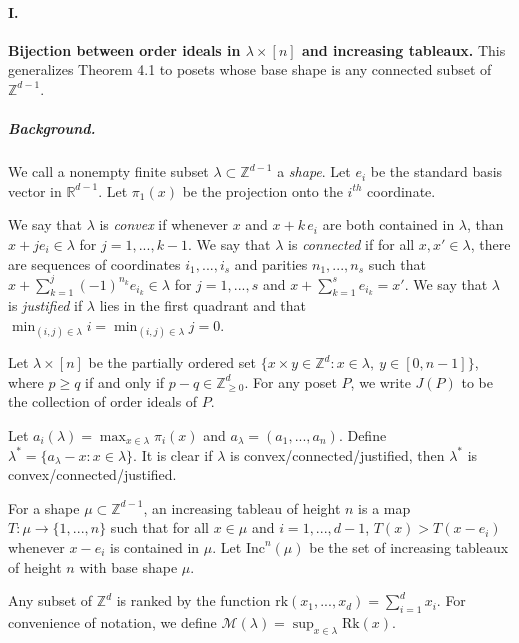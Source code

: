 \documentclass[10pt,letter]{article}
\begin{document}
\paragraph*{I.} \textbf{Bijection between order ideals in $\lambda \times [n]$ and increasing tableaux.} This generalizes Theorem 4.1 to posets whose base shape is any connected subset of $\mathbb{Z}^{d-1}$. 

\subparagraph*{Background.}

We call a nonempty finite subset $\lambda \subset \mathbb{Z}^{d-1}$ a \textit{shape}. Let $e_i$ be the standard basis vector in $\mathbb{R}^{d-1}$. Let $\pi_1(x)$ be the projection onto the $i^{th}$ coordinate.

We say that $\lambda$ is \textit{convex} if whenever $x$ and $x + k \, e_i$ are both contained in $\lambda$, than $x + j e_i \in \lambda$ for $j = 1,...,k-1$.  We say that $\lambda$ is \textit{connected} if for all $x,x' \in \lambda$, there are sequences of coordinates $i_1,...,i_s$ and parities $n_1,...,n_s$ such that $x + \sum_{k=1}^j (-1)^{n_k} e_{i_k} \in \lambda$ for $j = 1,...,s$ and $x + \sum_{k=1}^s e_{i_k} = x'$.  We say that $\lambda$ is \textit{justified} if $\lambda$ lies in the first quadrant and that $\min_{(i,j) \in \lambda} i = \min_{(i,j) \in \lambda} j = 0$. 

Let $\lambda \times [n]$ be the partially ordered set $\lbrace x \times y \in \mathbb{Z}^{d}: x \in \lambda, \ y \in [0,n-1] \rbrace$, where $p \geq q$ if and only if $p -q \in \mathbb{Z}_{\geq 0}^d$. For any poset $P$, we write $J(P)$ to be the collection of order ideals of $P$. 

Let $a_i(\lambda) = \max_{x \in \lambda} \pi_i(x)$ and $a_\lambda = (a_1,...,a_n)$. Define $\lambda^{\ast} = \lbrace a_\lambda - x: x \in \lambda \rbrace$. It is clear if $\lambda$ is convex/connected/justified, then $\lambda^{\ast}$ is convex/connected/justified. 

For a shape $\mu \subset \mathbb{Z}^{d-1}$, an increasing tableau of height $n$ is a map $T: \mu \rightarrow \lbrace 1,...,n \rbrace$ such that for all $x \in \mu$ and $i = 1,...,{d-1}$, $T(x) > T(x-e_i)$ whenever $x-e_i$ is contained in $\mu$. Let $\text{Inc}^n(\mu)$ be the set of increasing tableaux of height $n$ with base shape $\mu$. 

Any subset of $\mathbb{Z}^d$ is ranked by the function $\text{rk}(x_1,...,x_d) = \sum_{i=1}^d x_i$. For convenience of notation, we define $\mathcal{M}(\lambda) = \sup_{x \in \lambda} \text{Rk}(x)$. 
\end{document}
